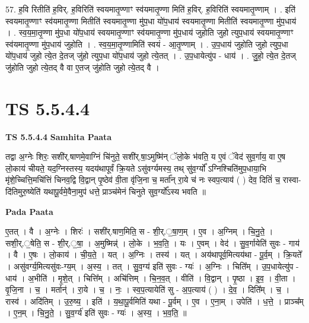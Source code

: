 \documentclass[17pt]{extarticle}
\begin{document}
57. ह॒वि रितीति॑ ह॒विर्. ह॒विरिति॑ स्वयमातृ॒ण्णाꣳ स्व॑यमातृ॒ण्णा मिति॑ ह॒विर्. ह॒विरिति॑ स्वयमातृ॒ण्णाम् । . इति॑ स्वयमातृ॒ण्णाꣳ स्व॑यमातृ॒ण्णा मितीति॑ स्वयमातृ॒ण्णा मु॑प॒धा यो॑प॒धाय॑ स्वयमातृ॒ण्णा मितीति॑ स्वयमातृ॒ण्णा मु॑प॒धाय॑ । . स्व॒य॒मा॒तृ॒ण्णा मु॑प॒धा यो॑प॒धाय॑ स्वयमातृ॒ण्णाꣳ स्व॑यमातृ॒ण्णा मु॑प॒धाय॑ जुहोति जुहो त्युप॒धाय॑ स्वयमातृ॒ण्णाꣳ स्व॑यमातृ॒ण्णा मु॑प॒धाय॑ जुहोति । . स्व॒य॒मा॒तृ॒ण्णामिति॑ स्वयं - आ॒तृ॒ण्णाम् । . उ॒प॒धाय॑ जुहोति जुहो त्युप॒धा यो॑प॒धाय॑ जुहो त्ये॒त दे॒तज् जु॑हो त्युप॒धा यो॑प॒धाय॑ जुहो त्ये॒तत् । . उ॒प॒धायेत्यु॑प - धाय॑ । . जु॒हो॒ त्ये॒त दे॒तज् जु॑होति जुहो त्ये॒तद् वै वा ए॒तज् जु॑होति जुहो त्ये॒तद् वै । \newline
\pagebreak
{}

\section{ TS 5.5.4.4 }

\textbf{TS 5.5.4.4 } \newline
\textbf{Samhita Paata} \newline

तद्वा अ॒ग्नेः शिरः॒ सशी॑र्.षाणमे॒वाग्निं चि॑नुते॒ सशी॑र्.षा॒ऽमुष्मि॑न् ॅलो॒के भ॑वति॒ य ए॒वं ॅवेद॑ सुव॒र्गाय॒ वा ए॒ष लो॒काय॑ चीयते॒ यद॒ग्निस्तस्य॒ यदय॑थापूर्वं क्रि॒यते ऽसु॑वर्ग्यमस्य॒ तथ् सु॑व॒र्ग्यो᳚ ऽग्निश्चिति॑मुप॒धाया॒भि मृ॑शे॒च्चित्ति॒मचि॑त्तिं चिनव॒द्वि वि॒द्वान् पृ॒ष्ठेव॑ वी॒ता वृ॑जि॒ना च॒ मर्ता᳚न् रा॒ये च॑ नः स्वप॒त्याय॑ ( ) देव॒ दितिं॑ च॒ रास्वा-दि॑तिमुरु॒ष्येति॑ यथापू॒र्वमे॒वैना॒मुप॑ धत्ते॒ प्राञ्च॑मेनं चिनुते सुव॒र्ग्यो᳚ऽस्य भवति ॥ \newline

\textbf{Pada Paata} \newline

ए॒तत् । वै । अ॒ग्नेः । शिरः॑ । सशी॑र्.षाण॒मिति॒ स - शी॒र्.॒षा॒ण॒म् । ए॒व । अ॒ग्निम् । चि॒नु॒ते॒ । सशी॒र्.॒षेति॒ स - शी॒र्.॒षा॒ । अ॒मुष्मिन्न्॑ । लो॒के । भ॒व॒ति॒ । यः । ए॒वम् । वेद॑ । सु॒व॒र्गायेति॑ सुवः - गाय॑ । वै । ए॒षः । लो॒काय॑ । ची॒य॒ते॒ । यत् । अ॒ग्निः । तस्य॑ । यत् । अय॑थापूर्व॒मित्यय॑था - पू॒र्व॒म् । क्रि॒यते᳚ । असु॑वर्ग्य॒मित्यसु॑वः-ग्य॒म् । अ॒स्य॒ । तत् । सु॒व॒ग्य॑ इति॑ सुवः - ग्यः॑ । अ॒ग्निः । चिति᳚म् । उ॒प॒धायेत्यु॑प - धाय॑ । अ॒भीति॑ । मृ॒शे॒त् । चित्ति᳚म् । अचि॑त्तिम् । चि॒न॒व॒त् । वीति॑ । वि॒द्वान् । पृ॒ष्ठा । इ॒व॒ । वी॒ता । वृ॒जि॒ना । च॒ । मर्तान्॑ । रा॒ये । च॒ । नः॒ । स्व॒प॒त्यायेति॑ सु - अ॒प॒त्याय॑ ( ) । दे॒व॒ । दिति᳚म् । च॒ । रास्व॑ । अदि॑तिम् । उ॒रु॒ष्य॒ । इति॑ । य॒था॒पू॒र्वमिति॑ यथा - पू॒र्वम् । ए॒व । ए॒ना॒म् । उपेति॑ । ध॒त्ते॒ । प्राञ्च᳚म् । ए॒न॒म् । चि॒नु॒ते॒ । सु॒व॒र्ग्य॑ इति॑ सुवः - ग्यः॑ । अ॒स्य॒ । भ॒व॒ति॒ ॥  \newline
\end{document}
